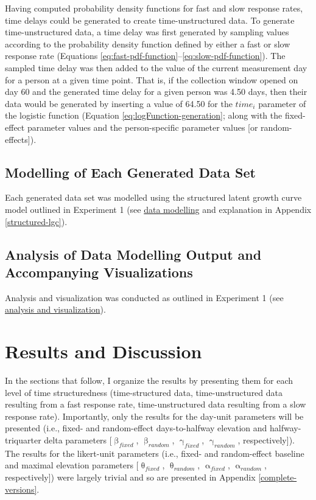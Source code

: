 \documentclass[
12pt, %
twoside,
english]{guelphthesis}
\begin{document}
Having computed probability density functions for fast and slow response rates, time delays could be generated to create time-unstructured data. To generate time-unstructured data, a time delay was first
generated by sampling values according to the probability density function defined by either a fast or slow response rate (Equations \ref{eq:fast-pdf-function}--\ref{eq:slow-pdf-function}). The sampled time delay was then added to the value of the current measurement day for a person at a given time point. That is, if the collection window opened on day 60 and the generated time delay for a given person was 4.50 days, then their data would be generated by inserting a value of 64.50 for the \(time_i\) parameter of the logistic function (Equation \ref{eq:logFunction-generation}; along with the fixed-effect parameter values and the person-specific parameter values {[}or random-effects{]}).

\hypertarget{data-modelling-exp3}{%
\subsection{Modelling of Each Generated Data Set}\label{data-modelling-exp3}}

Each generated data set was modelled using the structured latent growth curve model outlined in Experiment 1 (see \protect\hyperlink{data-modelling}{data modelling} and explanation in Appendix \ref{structured-lgc}).

\hypertarget{analysis-of-data-modelling-output-and-accompanying-visualizations-1}{%
\subsection{Analysis of Data Modelling Output and Accompanying Visualizations}\label{analysis-of-data-modelling-output-and-accompanying-visualizations-1}}

Analysis and visualization was conducted as outlined in Experiment 1 (see \protect\hyperlink{analysis-visualization}{analysis and visualization}).

\hypertarget{results-and-discussion-2}{%
\section{Results and Discussion}\label{results-and-discussion-2}}

In the sections that follow, I organize the results by presenting them for each level of time structuredness (time-structured data, time-unstructured data resulting from a fast response rate, time-unstructured data resulting from a slow response rate). Importantly, only the results for the day-unit parameters will be presented (i.e., fixed- and random-effect days-to-halfway elevation and halfway-triquarter delta parameters {[}\(\upbeta_{fixed}\), \(\upbeta_{random}\), \(\upgamma_{fixed}\), \(\upgamma_{random}\), respectively{]}). The results for the likert-unit parameters (i.e., fixed- and random-effect baseline and maximal elevation parameters {[}\(\uptheta_{fixed}\), \(\uptheta_{random}\), \(\upalpha_{fixed}\), \(\upalpha_{random}\), respectively{]}) were largely trivial and so are presented in Appendix \ref{complete-versions}.
\end{document}
